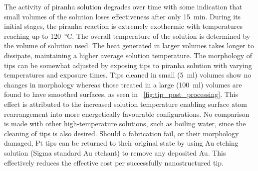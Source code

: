 \documentclass{article}
\begin{document}
The activity of piranha solution degrades over time with some indication that small volumes of the solution loses effectiveness after only \SI{15}{\minute}. During its initial stages, the piranha reaction is extremely exothermic with temperatures reaching up to \SI{120}{\celsius}. The overall temperature of the solution is determined by the volume of solution used. The heat generated in larger volumes takes longer to dissipate, maintaining a higher average solution temperature. The morphology of tips can be somewhat adjusted by exposing tips to piranha solution with varying temperatures and exposure times. Tips cleaned in small (\SI{5}{ml}) volumes show no changes in morphology whereas those treated in a large (\SI{100}{ml}) volumes are found to have smoothed surfaces, as seen in \figurename~\ref{fig:tip_post_processing}. This effect is attributed to the increased solution temperature enabling surface atom rearrangement into more energetically favourable configurations. No comparison is made with other high-temperature solutions, such as boiling water, since the cleaning of tips is also desired.
Should a fabrication fail, or their morphology damaged, Pt tips can be returned to their original state by using Au etching solution (Sigma standard Au etchant) to remove any deposited Au. This effectively reduces the effective cost per successfully nanostructured tip.
\end{document}
